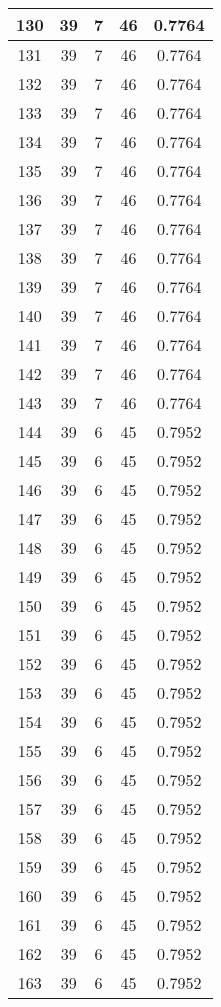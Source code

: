 \documentclass[letterpaper, 12pt]{article}
\begin{document}
\begin{longtable}{|c|c|c|c|c|}
\hline
130 & 39 & 7 & 46 & 0.7764 \\
\hline
131 & 39 & 7 & 46 & 0.7764 \\
\hline
132 & 39 & 7 & 46 & 0.7764 \\
\hline
133 & 39 & 7 & 46 & 0.7764 \\
\hline
134 & 39 & 7 & 46 & 0.7764 \\
\hline
135 & 39 & 7 & 46 & 0.7764 \\
\hline
136 & 39 & 7 & 46 & 0.7764 \\
\hline
137 & 39 & 7 & 46 & 0.7764 \\
\hline
138 & 39 & 7 & 46 & 0.7764 \\
\hline
139 & 39 & 7 & 46 & 0.7764 \\
\hline
140 & 39 & 7 & 46 & 0.7764 \\
\hline
141 & 39 & 7 & 46 & 0.7764 \\
\hline
142 & 39 & 7 & 46 & 0.7764 \\
\hline
143 & 39 & 7 & 46 & 0.7764 \\
\hline
144 & 39 & 6 & 45 & 0.7952 \\
\hline
145 & 39 & 6 & 45 & 0.7952 \\
\hline
146 & 39 & 6 & 45 & 0.7952 \\
\hline
147 & 39 & 6 & 45 & 0.7952 \\
\hline
148 & 39 & 6 & 45 & 0.7952 \\
\hline
149 & 39 & 6 & 45 & 0.7952 \\
\hline
150 & 39 & 6 & 45 & 0.7952 \\
\hline
151 & 39 & 6 & 45 & 0.7952 \\
\hline
152 & 39 & 6 & 45 & 0.7952 \\
\hline
153 & 39 & 6 & 45 & 0.7952 \\
\hline
154 & 39 & 6 & 45 & 0.7952 \\
\hline
155 & 39 & 6 & 45 & 0.7952 \\
\hline
156 & 39 & 6 & 45 & 0.7952 \\
\hline
157 & 39 & 6 & 45 & 0.7952 \\
\hline
158 & 39 & 6 & 45 & 0.7952 \\
\hline
159 & 39 & 6 & 45 & 0.7952 \\
\hline
160 & 39 & 6 & 45 & 0.7952 \\
\hline
161 & 39 & 6 & 45 & 0.7952 \\
\hline
162 & 39 & 6 & 45 & 0.7952 \\
\hline
163 & 39 & 6 & 45 & 0.7952 \\

\end{longtable}
\end{document}
